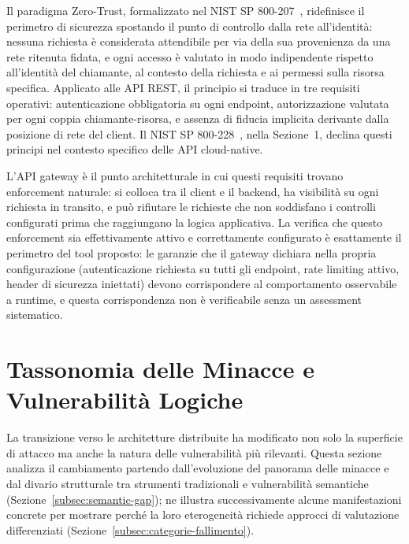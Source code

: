 Il paradigma Zero-Trust, formalizzato nel NIST SP 800-207~\cite{roseZeroTrustArchitecture2020}, ridefinisce il perimetro di sicurezza spostando il punto di controllo dalla rete all'identità: nessuna richiesta è considerata attendibile per via della sua provenienza da una rete ritenuta fidata, e ogni accesso è valutato in modo indipendente rispetto all'identità del chiamante, al contesto della richiesta e ai permessi sulla risorsa specifica.
Applicato alle \gls{API} REST, il principio si traduce in tre requisiti operativi: autenticazione obbligatoria su ogni endpoint, autorizzazione valutata per ogni coppia chiamante-risorsa, e assenza di fiducia implicita derivante dalla posizione di rete del client.
Il \gls{NIST} SP 800-228~\cite{chandramouliGuidelinesAPIProtection2026}, nella Sezione~1, declina questi principi nel contesto specifico delle API cloud-native.

L'\gls{API} gateway è il punto architetturale in cui questi requisiti trovano enforcement naturale: si colloca tra il client e il backend, ha visibilità su ogni richiesta in transito, e può rifiutare le richieste che non soddisfano i controlli configurati prima che raggiungano la logica applicativa. La verifica che questo enforcement sia effettivamente attivo e correttamente configurato è esattamente il perimetro del tool proposto: le garanzie che il gateway dichiara nella propria configurazione (autenticazione richiesta su tutti gli endpoint, rate limiting attivo, header di sicurezza iniettati) devono corrispondere al comportamento osservabile a runtime, e questa corrispondenza non è verificabile senza un assessment sistematico.


\section{Tassonomia delle Minacce e Vulnerabilità Logiche}\label{sec:minacce}

La transizione verso le architetture distribuite ha modificato non solo la superficie di attacco ma anche la natura delle vulnerabilità più rilevanti. Questa sezione analizza il cambiamento partendo dall'evoluzione del panorama delle minacce e dal divario strutturale tra strumenti tradizionali e vulnerabilità semantiche (Sezione~\ref{subsec:semantic-gap}); ne illustra successivamente alcune manifestazioni concrete per mostrare perché la loro eterogeneità richiede approcci di valutazione differenziati (Sezione~\ref{subsec:categorie-fallimento}).

